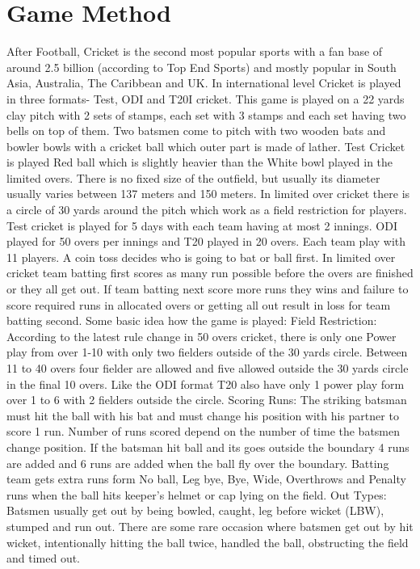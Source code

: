 \section{Game Method}
After Football, Cricket is the second most popular sports with a fan base of around 2.5 billion (according to Top End Sports) and mostly popular in South Asia, Australia, The Caribbean and UK. In international level Cricket is played in three formats- Test, ODI and T20I cricket. This game is played on a 22 yards clay pitch with 2 sets of stamps, each set with 3 stamps and each set having two bells on top of them. Two batsmen come to pitch with two wooden bats and bowler bowls with a cricket ball which outer part is made of lather. Test Cricket is played Red ball which is slightly heavier than the White bowl played in the limited overs. There is no fixed size of the outfield, but usually its diameter usually varies between 137 meters and 150 meters. In limited over cricket there is a circle of 30 yards around the pitch which work as a field restriction for players. Test cricket is played for 5 days with each team having at most 2 innings. ODI played for 50 overs per innings and T20 played in 20 overs. Each team play with 11 players. A coin toss decides who is going to bat or ball first. In limited over cricket team batting first scores as many run possible before the overs are finished or they all get out. If team batting next score more runs they wins and failure to score required runs in allocated overs or getting all out result in loss for team batting second. Some basic idea how the game is played:
Field Restriction: According to the latest rule change in 50 overs cricket, there is only one Power play from over 1-10 with only two fielders outside of the 30 yards circle. Between 11 to 40 overs four fielder are allowed and five allowed outside the 30 yards circle in the final 10 overs. Like the ODI format T20 also have only 1 power play form over 1 to 6 with 2 fielders outside the circle.
Scoring Runs: The striking batsman must hit the ball with his bat and must change his position with his partner to score 1 run. Number of runs scored depend on the number of time the batsmen change position. If the batsman hit ball and its goes outside the boundary 4 runs are added and 6 runs are added when the ball fly over the boundary. Batting team gets extra runs form No ball, Leg bye, Bye, Wide, Overthrows and Penalty runs when the ball hits keeper’s helmet or cap lying on the field.
Out Types: Batsmen usually get out by being bowled, caught, leg before wicket (LBW), stumped and run out. There are some rare occasion where batsmen get out by hit wicket, intentionally hitting the ball twice, handled the ball, obstructing the field and timed out.
